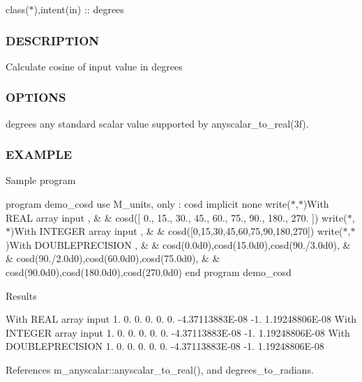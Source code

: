class($\ast$),intent(in) \+:\+: degrees \subsubsection*{D\+E\+S\+C\+R\+I\+P\+T\+I\+ON}

Calculate cosine of input value in degrees

\subsubsection*{O\+P\+T\+I\+O\+NS}

degrees any standard scalar value supported by anyscalar\+\_\+to\+\_\+real(3f). \subsubsection*{E\+X\+A\+M\+P\+LE}

Sample program

program demo\+\_\+cosd use M\+\_\+units, only \+: cosd implicit none write($\ast$,$\ast$)\textquotesingle{}With R\+E\+AL array input \textquotesingle{}, \& \& cosd(\mbox{[} 0., 15., 30., 45., 60., 75., 90., 180., 270. \mbox{]}) write($\ast$,$\ast$)\textquotesingle{}With I\+N\+T\+E\+G\+ER array input \textquotesingle{}, \& \& cosd(\mbox{[}0,15,30,45,60,75,90,180,270\mbox{]}) write($\ast$,$\ast$)\textquotesingle{}With D\+O\+U\+B\+L\+E\+P\+R\+E\+C\+I\+S\+I\+ON \textquotesingle{}, \& \& cosd(0.\+0d0),cosd(15.\+0d0),cosd(90./3.0d0), \& \& cosd(90./2.0d0),cosd(60.\+0d0),cosd(75.\+0d0), \& \& cosd(90.\+0d0),cosd(180.\+0d0),cosd(270.\+0d0) end program demo\+\_\+cosd

Results

With R\+E\+AL array input 1. 0. 0. 0. 0. 0. -\/4.\+37113883E-\/08 -\/1. 1.\+19248806E-\/08 With I\+N\+T\+E\+G\+ER array input 1. 0. 0. 0. 0. 0. -\/4.\+37113883E-\/08 -\/1. 1.\+19248806E-\/08 With D\+O\+U\+B\+L\+E\+P\+R\+E\+C\+I\+S\+I\+ON 1. 0. 0. 0. 0. 0. -\/4.\+37113883E-\/08 -\/1. 1.\+19248806E-\/08 

References m\+\_\+anyscalar\+::anyscalar\+\_\+to\+\_\+real(), and degrees\+\_\+to\+\_\+radians.

